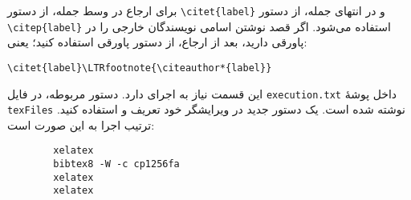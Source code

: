 برای ارجاع در وسط جمله، از دستور
\verb|\citet{label}|
و در انتهای جمله، از دستور
\verb|\citep{label}|
استفاده می‌شود. اگر قصد نوشتن اسامی نویسندگان خارجی را در پاورقی دارید،
بعد از ارجاع، از دستور پاورقی استفاده کنید؛ یعنی:
\begin{latin}\noindent
	\verb|\citet{label}\LTRfootnote{\citeauthor*{label}}|
\end{latin}

این قسمت نیاز به اجرای
دارد. دستور مربوطه، در فایل
\verb|execution.txt|
داخل پوشهٔ
\verb|texFiles|
نوشته شده است. یک دستور جدید در ویرایشگر خود تعریف و استفاده کنید. ترتیب اجرا به این صورت است:
\begin{latin}
	\begin{verbatim}
		xelatex
		bibtex8 -W -c cp1256fa
		xelatex
		xelatex
	\end{verbatim}
\end{latin}